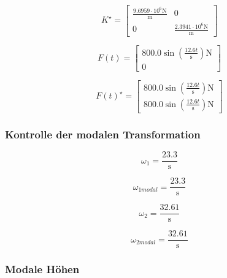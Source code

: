\documentclass[
  letterpaper,
  DIV=11]{scrreprt}
\begin{document}
\begin{equation}K^{\star} = \left[\begin{matrix}\frac{9.6959 \cdot 10^{6} \text{N}}{\text{m}} & 0\\0 & \frac{2.3941 \cdot 10^{6} \text{N}}{\text{m}}\end{matrix}\right]\end{equation}

\begin{equation}F(t) = \left[\begin{matrix}800.0 \sin{\left(\frac{12.6 t}{\text{s}} \right)} \text{N}\\0\end{matrix}\right]\end{equation}

\begin{equation}F(t)^{\star} = \left[\begin{matrix}800.0 \sin{\left(\frac{12.6 t}{\text{s}} \right)} \text{N}\\800.0 \sin{\left(\frac{12.6 t}{\text{s}} \right)} \text{N}\end{matrix}\right]\end{equation}

\hypertarget{kontrolle-der-modalen-transformation}{%
\subsubsection{Kontrolle der modalen
Transformation}\label{kontrolle-der-modalen-transformation}}

\begin{equation}\omega_{1} = \frac{23.3}{\text{s}}\end{equation}

\begin{equation}\omega_{1 modal} = \frac{23.3}{\text{s}}\end{equation}

\begin{equation}\omega_{2} = \frac{32.61}{\text{s}}\end{equation}

\begin{equation}\omega_{2 modal} = \frac{32.61}{\text{s}}\end{equation}

\hypertarget{modale-huxf6hen}{%
\subsubsection{Modale Höhen}\label{modale-huxf6hen}}
\end{document}
